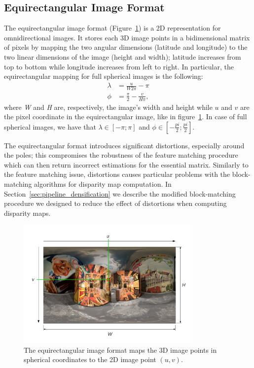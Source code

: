 \subsection{Equirectangular Image Format}
\label{subsec:image_format}
The equirectangular image format (Figure~\ref{fig:equirectangular}) is a 2D
representation for omnidirectional 
images. It stores each 3D image points in a bidimensional matrix of pixels
by mapping the two angular dimensions (latitude and longitude) to the two
linear dimensions of the image (height and width); latitude increases from 
top to bottom while longitude increases from left to right.
In particular, the equirectangular mapping for full spherical images is the
following:
%
\begin{subequations}
	\label{eq:ll2Cartesian_first}
	\begin{align}
	\lambda &= \frac{u}{W 2 \pi} - \pi \\
	\phi &= \frac{\pi}{2} - \frac{v}{H \pi}\text{,}
	\end{align}
\end{subequations}
%
\noindent where \textit{W} and \textit{H} are, respectively, 
the image's width and height while $u$ and $v$ are the pixel coordinate 
in the equirectangular image, like in figure~\ref{fig:equirectangular}.
In case of full spherical images, we have that
$ \lambda \in [-\pi; \pi] $ and $\phi \in [-\frac{pi}{2}; \frac{pi}{2}] $.

The equirectangular format introduces significant distortions, especially 
around the poles; this compromises the robustness of the feature matching 
procedure which can then return incorrect estimations for the essential 
matrix.
Similarly to the feature matching issue, distortions causes particular problems
with the block-matching algorithms for disparity map computation.
In Section~\ref{sec:pipeline_densification} we describe the modified 
block-matching procedure we designed to reduce the effect of distortions 
when computing disparity maps.

\begin{figure}[h]
	\centering
	\includegraphics[width=0.8\textwidth]{img/equirectangular}
	\caption{The equirectangular image format maps the 3D image points in 
	spherical coordinates to the 2D image point $(u, v)$.}
	\label{fig:equirectangular}
\end{figure}

